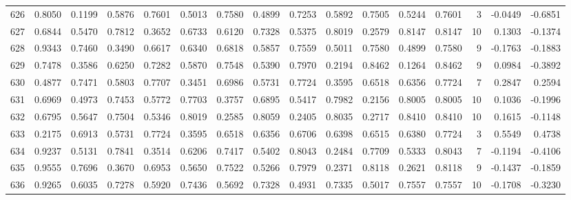 \begin{tabular}{lrrrrrrrrrrrrrrr}
626 &      0.8050 &  0.1199 &  0.5876 &  0.7601 &  0.5013 &  0.7580 &  0.4899 &  0.7253 &  0.5892 &  0.7505 &   0.5244 &     0.7601 &      3 &                   -0.0449 &                    -0.6851 \\
627 &      0.6844 &  0.5470 &  0.7812 &  0.3652 &  0.6733 &  0.6120 &  0.7328 &  0.5375 &  0.8019 &  0.2579 &   0.8147 &     0.8147 &     10 &                    0.1303 &                    -0.1374 \\
628 &      0.9343 &  0.7460 &  0.3490 &  0.6617 &  0.6340 &  0.6818 &  0.5857 &  0.7559 &  0.5011 &  0.7580 &   0.4899 &     0.7580 &      9 &                   -0.1763 &                    -0.1883 \\
629 &      0.7478 &  0.3586 &  0.6250 &  0.7282 &  0.5870 &  0.7548 &  0.5390 &  0.7970 &  0.2194 &  0.8462 &   0.1264 &     0.8462 &      9 &                    0.0984 &                    -0.3892 \\
630 &      0.4877 &  0.7471 &  0.5803 &  0.7707 &  0.3451 &  0.6986 &  0.5731 &  0.7724 &  0.3595 &  0.6518 &   0.6356 &     0.7724 &      7 &                    0.2847 &                     0.2594 \\
631 &      0.6969 &  0.4973 &  0.7453 &  0.5772 &  0.7703 &  0.3757 &  0.6895 &  0.5417 &  0.7982 &  0.2156 &   0.8005 &     0.8005 &     10 &                    0.1036 &                    -0.1996 \\
632 &      0.6795 &  0.5647 &  0.7504 &  0.5346 &  0.8019 &  0.2585 &  0.8059 &  0.2405 &  0.8035 &  0.2717 &   0.8410 &     0.8410 &     10 &                    0.1615 &                    -0.1148 \\
633 &      0.2175 &  0.6913 &  0.5731 &  0.7724 &  0.3595 &  0.6518 &  0.6356 &  0.6706 &  0.6398 &  0.6515 &   0.6380 &     0.7724 &      3 &                    0.5549 &                     0.4738 \\
634 &      0.9237 &  0.5131 &  0.7841 &  0.3514 &  0.6206 &  0.7417 &  0.5402 &  0.8043 &  0.2484 &  0.7709 &   0.5333 &     0.8043 &      7 &                   -0.1194 &                    -0.4106 \\
635 &      0.9555 &  0.7696 &  0.3670 &  0.6953 &  0.5650 &  0.7522 &  0.5266 &  0.7979 &  0.2371 &  0.8118 &   0.2621 &     0.8118 &      9 &                   -0.1437 &                    -0.1859 \\
636 &      0.9265 &  0.6035 &  0.7278 &  0.5920 &  0.7436 &  0.5692 &  0.7328 &  0.4931 &  0.7335 &  0.5017 &   0.7557 &     0.7557 &     10 &                   -0.1708 &                    -0.3230 \\

\end{tabular}
